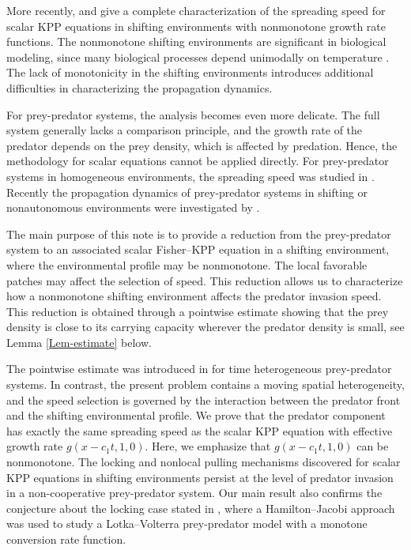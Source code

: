 \documentclass[10pt]{article}
\numberwithin{equation}{section}
\begin{document}
  
More  recently, \cite{GGM2024} and \cite{LNY2024} give a complete characterization of the spreading speed for scalar KPP equations in shifting environments with  nonmonotone growth rate functions. 
The nonmonotone shifting environments  are significant  in biological modeling, since many biological processes depend  unimodally on  temperature \cite{deutsch2008impacts}.    The lack of  monotonicity  in the shifting environments introduces additional difficulties in characterizing the propagation dynamics.  

   
   

For prey-predator systems, the analysis becomes even more delicate. The full system generally lacks a  comparison principle, and the growth rate of the predator depends on the prey density, which is affected by predation.    Hence, the methodology for  scalar equations  cannot be applied directly.   For  prey-predator systems in homogeneous environments, the spreading speed was studied in \cite{ducrot2021asymptotic, ducrot2019spreading}. Recently  the propagation dynamics of  prey-predator systems in shifting or nonautonomous  environments were investigated by \cite{choi2021persistence, LamLee2024pp, ducrotjin2023systemspreading}.      

The main purpose of this note is to  provide a  reduction from the prey-predator system to an associated scalar Fisher--KPP equation in a shifting environment, where the  environmental profile may be nonmonotone.   The local favorable patches may affect the selection of  speed.   This reduction allows us to  characterize how a nonmonotone shifting environment affects the predator invasion speed. This reduction is obtained through  a pointwise estimate showing that the prey density is  close to its carrying capacity wherever the predator density is small, see Lemma \ref{Lem-estimate} below.    

The pointwise estimate was introduced in  \cite{ducrotjin2023systemspreading} for time heterogeneous prey-predator systems.   In contrast,  the present problem contains a moving spatial heterogeneity, and the speed selection is governed by the interaction between the predator front and the shifting environmental profile.   We prove   that the predator component has exactly the same spreading speed as the scalar KPP equation with effective growth rate   $g(x-c_1t, 1, 0)$. Here, we emphasize that $g(x-c_1t, 1,0)$ can be nonmonotone. 
The locking and nonlocal pulling mechanisms discovered for scalar KPP equations in shifting environments persist at the level of predator invasion in a non-cooperative  prey-predator system.
Our main result  also confirms  the conjecture about  the locking case stated in \cite[Remark 3]{LamLee2024pp}, where a  Hamilton--Jacobi approach was used  to  study  a Lotka--Volterra prey-predator model with a monotone conversion rate function.    
\end{document}
